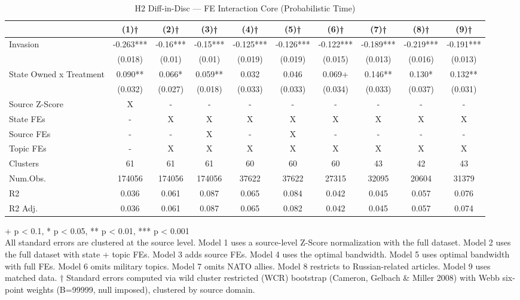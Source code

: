 \begin{table}[t]
\caption{\label{tab:table-s03}H2 Diff-in-Disc — FE Interaction Core (Probabilistic Time)}
\fontsize{12.0pt}{14.0pt}\selectfont
\begin{tabular*}{\linewidth}{@{\extracolsep{\fill}}lccccccccc}
\toprule
  & (1)† & (2)† & (3)† & (4)† & (5)† & (6)† & (7)† & (8)† & (9)† \\ 
\midrule\addlinespace[2.5pt]
Invasion & -0.263*** & -0.16*** & -0.15*** & -0.125*** & -0.126*** & -0.122*** & -0.189*** & -0.219*** & -0.191*** \\ 
 & (0.018) & (0.01) & (0.01) & (0.019) & (0.019) & (0.015) & (0.013) & (0.016) & (0.013) \\ 
State Owned x Treatment & 0.090** & 0.066* & 0.059** & 0.032 & 0.046 & 0.069+ & 0.146** & 0.130* & 0.132** \\ 
{} & {(0.032)} & {(0.027)} & {(0.018)} & {(0.033)} & {(0.033)} & {(0.034)} & {(0.033)} & {(0.037)} & {(0.031)} \\ 
Source Z-Score & X & - & - & - & - & - & - & - & - \\ 
State FEs & - & X & X & X & X & X & X & X & X \\ 
Source FEs & - & - & X & - & X & - & - & - & - \\ 
Topic FEs & - & X & X & X & X & X & X & X & X \\ 
Clusters & 61 & 61 & 61 & 60 & 60 & 60 & 43 & 42 & 43 \\ 
Num.Obs. & 174056 & 174056 & 174056 & 37622 & 37622 & 27315 & 32095 & 20604 & 31379 \\ 
R2 & 0.036 & 0.061 & 0.087 & 0.065 & 0.084 & 0.042 & 0.045 & 0.057 & 0.076 \\ 
R2 Adj. & 0.036 & 0.061 & 0.087 & 0.065 & 0.082 & 0.042 & 0.045 & 0.057 & 0.074 \\ 
\bottomrule
\end{tabular*}
\begin{minipage}{\linewidth}
\vspace{.05em}
+ p < 0.1, * p < 0.05, ** p < 0.01, *** p < 0.001\\
All standard errors are clustered at the source level. Model 1 uses a
source-level Z-Score normalization with the full dataset. Model 2 uses the
full dataset with state + topic FEs. Model 3 adds source FEs. Model 4 uses the
optimal bandwidth. Model 5 uses optimal bandwidth with full FEs. Model 6 omits
military topics. Model 7 omits NATO allies. Model 8 restricts to Russian-related
articles. Model 9 uses matched data. † Standard errors computed via wild cluster
restricted (WCR) bootstrap (Cameron, Gelbach \& Miller 2008) with Webb six-point
weights (B=99999, null imposed), clustered by source domain.\\
\end{minipage}
\end{table}

